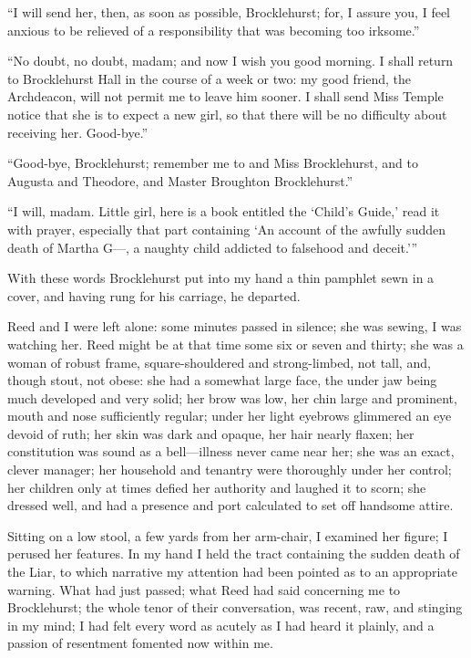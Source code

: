 \enquote{I will send her, then, as soon as possible, \Mr{} Brocklehurst;
for, I assure you, I feel anxious to be relieved of a responsibility
that was becoming too irksome.}

\enquote{No doubt, no doubt, madam; and now I wish you good morning. I
shall return to Brocklehurst Hall in the course of a week or two: my
good friend, the Archdeacon, will not permit me to leave him sooner. I
shall send Miss Temple notice that she is to expect a new girl, so that
there will be no difficulty about receiving her. Good-bye.}

\enquote{Good-bye, \Mr{} Brocklehurst; remember me to \Mrs{} and Miss
Brocklehurst, and to Augusta and Theodore, and Master Broughton
Brocklehurst.}

\enquote{I will, madam. Little girl, here is a book entitled the
\enquote{Child's Guide,} read it with prayer, especially that part
containing \enquote{An account of the awfully sudden death of Martha
G---, a naughty child addicted to falsehood and deceit.}}

With these words \Mr{} Brocklehurst put into my hand a thin pamphlet sewn
in a cover, and having rung for his carriage, he departed.

\Mrs{} Reed and I were left alone: some minutes passed in silence; she was
sewing, I was watching her. \Mrs{} Reed might be at that time some six or
seven and thirty; she was a woman of robust frame, square-shouldered and
strong-limbed, not tall, and, though stout, not obese: she had a
somewhat large face, the under jaw being much developed and very solid;
her brow was low, her chin large and prominent, mouth and nose
sufficiently regular; under her light eyebrows glimmered an eye devoid
of ruth; her skin was dark and opaque, her hair nearly flaxen; her
constitution was sound as a bell---illness never came near her; she was
an exact, clever manager; her household and tenantry were thoroughly
under her control; her children only at times defied her authority and
laughed it to scorn; she dressed well, and had a presence and port
calculated to set off handsome attire.

Sitting on a low stool, a few yards from her arm-chair, I examined her
figure; I perused her features. In my hand I held the tract containing
the sudden death of the Liar, to which narrative my attention had been
pointed as to an appropriate warning. What had just passed; what \Mrs{}
Reed had said concerning me to \Mr{} Brocklehurst; the whole tenor of
their conversation, was recent, raw, and stinging in my mind; I had felt
every word as acutely as I had heard it plainly, and a passion of
resentment fomented now within me.

